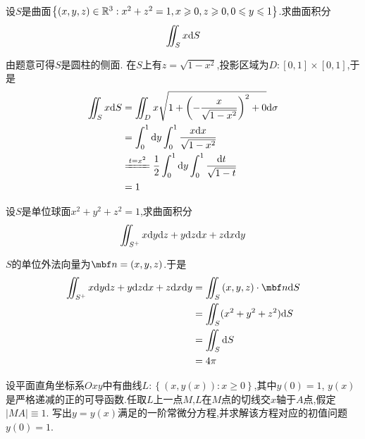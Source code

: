 \documentclass{ctexart}
\begin{document}
\begin{problem}[5.(10\songti{分})]
    设$S$是曲面$\left\{(x,y,z)\in\mathbb{R}^3:x^2+z^2=1,x\geqslant 0,z\geqslant 0,0\leqslant y\leqslant 1\right\}$.求曲面积分
    \[\iint_Sx\mathrm{d} S\]

\end{problem}
\begin{solution}
    由题意可得$S$是圆柱的侧面.
    在$S$上有$z=\sqrt{1-x^2}$,投影区域为$D:[0,1]\times[0,1]$,于是
    \[\begin{aligned}
        \iint_{S}x\di S
        &= \iint_{D}x\sqrt{1+\left(-\dfrac{x}{\sqrt{1-x^2}}\right)^2+0}\di\sigma \\
        &= \int_0^1\di y\int_0^1\dfrac{x\di x}{\sqrt{1-x^2}} \\
        &\xlongequal{t=x^2} \dfrac12\int_0^1\di y\int_0^1\dfrac{\di t}{\sqrt{1-t}} \\
        &= 1
    \end{aligned}\]
    
\end{solution}
\begin{problem}[6.(10\songti{分})]
    设$S$是单位球面$x^2+y^2+z^2=1$,求曲面积分
    \[\iint_{S^+}x\mathrm{d} y\mathrm{d} z+y\mathrm{d} z\mathrm{d} x+z\mathrm{d} x\mathrm{d} y\]

\end{problem}
\begin{solution}
    $S$的单位外法向量为$\mbf n=(x,y,z)$.于是
    \[\begin{aligned}
        \iint_{S^+}x\di y\di z+y\di z\di x+z\di x\di y
        &= \iint_S\left(x,y,z\right)\cdot\mbf n\di S \\
        &= \iint_S(x^2+y^2+z^2)\di S \\
        &= \iint_S\di S \\
        &= 4\pi
    \end{aligned}\]
\end{solution}
\begin{problem}[7.(15\songti{分})]
    设平面直角坐标系$Oxy$中有曲线$L:\left\{(x,y(x)):x\geqslant0\right\}$,其中$y(0)=1$,%
    $y(x)$是严格递减的正的可导函数.任取$L$上一点$M$,$L$在$M$点的切线交$x$轴于$A$点,假定$\left|MA\right|\equiv1$.%
    写出$y=y(x)$满足的一阶常微分方程,并求解该方程对应的初值问题$y(0)=1$.
\end{problem}
\end{document}
